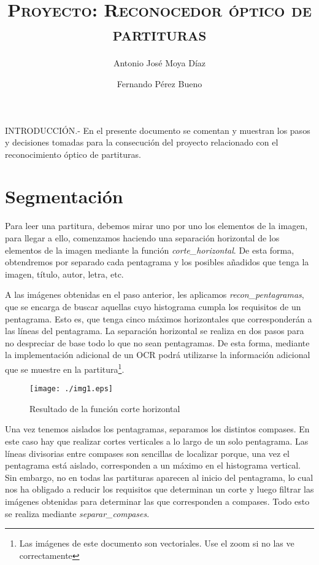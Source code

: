 \documentclass[10pt, a4paper]{article}
\title{\textsc{Proyecto: Reconocedor óptico de partituras}}
\author{Antonio José Moya Díaz \and Fernando Pérez Bueno}
\begin{document}
\maketitle

INTRODUCCIÓN.- En el presente documento se comentan y muestran los pasos y decisiones tomadas para la consecución del proyecto relacionado con el reconocimiento óptico de partituras.

\section{Segmentación}

Para leer una partitura, debemos mirar uno por uno los elementos de la imagen, para llegar a ello, comenzamos haciendo una separación horizontal de los elementos de la imagen mediante la función \emph{corte\_horizontal}. De esta forma, obtendremos por separado cada pentagrama y los posibles añadidos que tenga la imagen, título, autor, letra, etc. 

A las imágenes obtenidas en el paso anterior, les aplicamos \emph{recon\_pentagramas}, que se encarga de buscar aquellas cuyo histograma cumpla los requisitos de un pentagrama. Esto es, que tenga cinco máximos horizontales que corresponderán a las líneas del pentagrama. La separación horizontal se realiza en dos pasos para no despreciar de base todo lo que no sean pentagramas. De esta forma, mediante la implementación adicional de un OCR podrá utilizarse la información adicional que se muestre en la partitura\footnote{Las imágenes de este documento son vectoriales. Use el zoom si no las ve correctamente}.

\begin{figure}[h!]
  \centering
    \texttt{[image: ./img1.eps]}
  \caption{Resultado de la función corte horizontal}
  \label{fig1}
\end{figure}

Una vez tenemos aislados los pentagramas, separamos los distintos compases. En este caso hay que realizar cortes verticales a lo largo de un solo pentagrama. Las líneas divisorias entre compases son sencillas de localizar porque, una vez el pentagrama está aislado, corresponden a un máximo en el histograma vertical. Sin embargo, no en todas las partituras aparecen al inicio del pentagrama, lo cual nos ha obligado a reducir los requisitos que determinan un corte y luego filtrar las imágenes obtenidas para determinar las que corresponden a compases. Todo esto se realiza mediante \emph{separar\_compases}.
\end{document}
